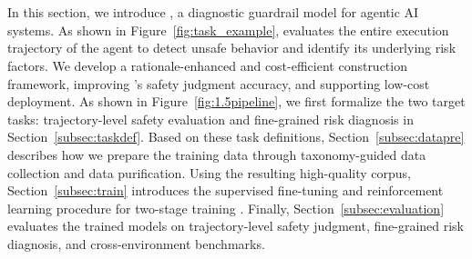 \section{\agentdog{}}
\label{sec:agentdog}

In this section, we introduce \agentdog{}, a diagnostic guardrail model for agentic AI systems. As shown in Figure~\ref{fig:task_example}, \agentdog{} evaluates the entire execution trajectory of the agent to detect unsafe behavior and identify its underlying risk factors. We develop a rationale-enhanced and cost-efficient construction framework, improving \agentdog{}'s safety judgment accuracy, and supporting low-cost deployment. As shown in Figure~\ref{fig:1.5pipeline}, we first formalize the two target tasks: trajectory-level safety evaluation and fine-grained risk diagnosis in Section~\ref{subsec:taskdef}. Based on these task definitions, Section~\ref{subsec:datapre} describes how we prepare the training data through taxonomy-guided data collection and data purification. Using the resulting high-quality corpus, Section~\ref{subsec:train} introduces the supervised fine-tuning and reinforcement learning procedure for two-stage training \agentdog{}. Finally, Section~\ref{subsec:evaluation} evaluates the trained models on trajectory-level safety judgment, fine-grained risk diagnosis, and cross-environment benchmarks.


